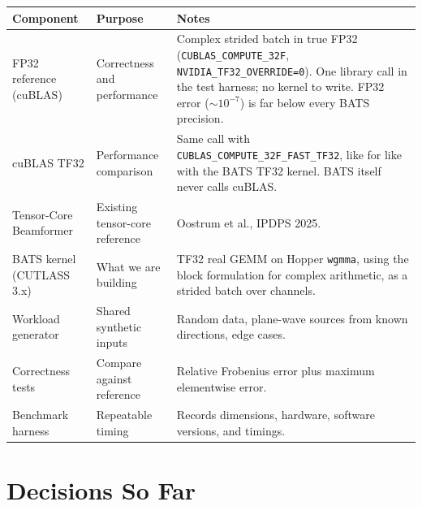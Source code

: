 \documentclass[10pt,letterpaper]{article}
\begin{document}
\begin{tabularx}{\linewidth}{@{}l l X@{}}
  \toprule
  \textbf{Component} & \textbf{Purpose} & \textbf{Notes} \\
  \midrule
  FP32 reference (cuBLAS) & Correctness and performance & Complex strided batch in true FP32 (\texttt{CUBLAS\_COMPUTE\_32F}, \texttt{NVIDIA\_TF32\_OVERRIDE=0}). One library call in the test harness; no kernel to write. FP32 error ($\sim 10^{-7}$) is far below every BATS precision. \\
  cuBLAS TF32 & Performance comparison & Same call with \texttt{CUBLAS\_COMPUTE\_32F\_FAST\_TF32}, like for like with the BATS TF32 kernel. BATS itself never calls cuBLAS. \\
  Tensor-Core Beamformer & Existing tensor-core reference & Oostrum et al., IPDPS 2025. \\
  BATS kernel (CUTLASS 3.x) & What we are building & TF32 real GEMM on Hopper \texttt{wgmma}, using the block formulation for complex arithmetic, as a strided batch over channels. \\
  Workload generator & Shared synthetic inputs & Random data, plane-wave sources from known directions, edge cases. \\
  Correctness tests & Compare against reference & Relative Frobenius error plus maximum elementwise error. \\
  Benchmark harness & Repeatable timing & Records dimensions, hardware, software versions, and timings. \\
  \bottomrule
\end{tabularx}

\section*{Decisions So Far}
\end{document}
